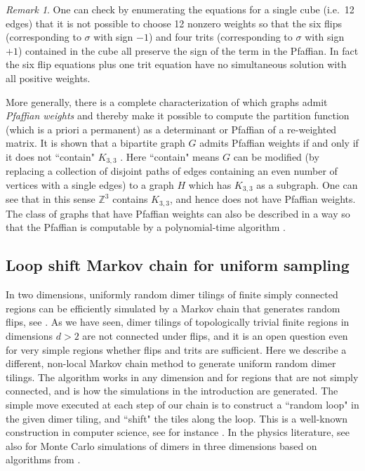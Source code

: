 \documentclass[11pt]{article}
\theoremstyle{remark}
\newtheorem{rem}[thm]{Remark}
\theoremstyle{definition}
\newcommand{\m}[1]{\mathbb{#1}}
\begin{document}
\begin{rem}
One can check by enumerating the equations for a single cube (i.e.\ 12 edges) that it is not possible to choose 12 nonzero weights so that the six flips (corresponding to $\sigma$ with sign $-1$) and four trits (corresponding to $\sigma$ with sign $+1$) contained in the cube all preserve the sign of the term in the Pfaffian. In fact the six flip equations plus one trit equation have no simultaneous solution with all positive weights. 

More generally, there is a complete characterization of which graphs admit \textit{Pfaffian weights} and thereby make it possible to compute the partition function (which is a priori a permanent) as a determinant or Pfaffian of a re-weighted matrix. It is shown that a bipartite graph $G$ admits Pfaffian weights if and only if it does not ``contain" $K_{3,3}$ \cite{LITTLE1975187}. Here ``contain" means $G$ can be modified (by replacing a collection of disjoint paths of edges containing an even number of vertices with a single edges) to a graph $H$ which has $K_{3,3}$ as a subgraph. One can see that in this sense $\m Z^3$ contains $K_{3,3}$, and hence does not have Pfaffian weights. The class of graphs that have Pfaffian weights can also be described in a way so that the Pfaffian is computable by a polynomial-time algorithm \cite{Pfaffians1999}.
\end{rem}




\subsection{Loop shift Markov chain for uniform sampling}\label{sec:uniform sampling}

In two dimensions, uniformly random dimer tilings of finite simply connected regions can be efficiently simulated by a Markov chain that generates random flips, see \cite{randall2000mixing}. As we have seen, dimer tilings of topologically trivial finite regions in dimensions $d>2$ are not connected under flips, and it is an open question even for very simple regions whether flips and trits are sufficient. Here we describe a different, non-local Markov chain method to generate uniform random dimer tilings. The algorithm works in any dimension and for regions that are not simply connected, and is how the simulations in the introduction are generated. The simple move executed at each step of our chain is to construct a ``random loop" in the given dimer tiling, and ``shift" the tiles along the loop. This is a well-known construction in computer science, see for instance \cite[Section 3]{marry_at_random}. In the physics literature, see also \cite{Huse2003} for Monte Carlo simulations of dimers in three dimensions based on algorithms from \cite{Krauth2003pocket,Dress1995}.
\end{document}
